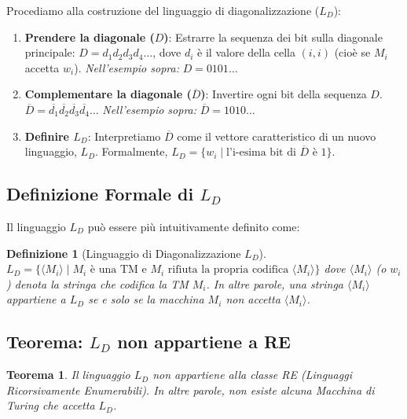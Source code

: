 \documentclass[a4paper]{article}
\newtheorem{theorem}{Teorema}
\newtheorem{definition}{Definizione}
\begin{document}
Procediamo alla costruzione del linguaggio di diagonalizzazione ($L_D$):
\begin{enumerate}
    \item \textbf{Prendere la diagonale ($D$)}: Estrarre la sequenza dei bit sulla diagonale principale: $D = d_1 d_2 d_3 d_4 \dots$, dove $d_i$ è il valore della cella $(i,i)$ (cioè se $M_i$ accetta $w_i$).
    \textit{Nell'esempio sopra:} $D = 0101\dots$
    \item \textbf{Complementare la diagonale ($\overline{D}$)}: Invertire ogni bit della sequenza $D$.
    $\overline{D} = \overline{d_1} \overline{d_2} \overline{d_3} \overline{d_4} \dots$
    \textit{Nell'esempio sopra:} $\overline{D} = 1010\dots$
    \item \textbf{Definire $L_D$}: Interpretiamo $\overline{D}$ come il vettore caratteristico di un nuovo linguaggio, $L_D$.
    Formalmente, $L_D = \{ w_i \mid \text{l'i-esima bit di } \overline{D} \text{ è } 1 \}$.
\end{enumerate}

\subsection{Definizione Formale di $L_D$}

Il linguaggio $L_D$ può essere più intuitivamente definito come:
\begin{definition}[Linguaggio di Diagonalizzazione $L_D$]
$L_D = \{ \langle M_i \rangle \mid M_i \text{ è una TM e } M_i \text{ rifiuta la propria codifica } \langle M_i \rangle \}$
dove $\langle M_i \rangle$ (o $w_i$) denota la stringa che codifica la TM $M_i$.
In altre parole, una stringa $\langle M_i \rangle$ appartiene a $L_D$ se e solo se la macchina $M_i$ non accetta $\langle M_i \rangle$.
\end{definition}

\subsection{Teorema: $L_D$ non appartiene a RE}

\begin{theorem}
Il linguaggio $L_D$ non appartiene alla classe RE (Linguaggi Ricorsivamente Enumerabili). In altre parole, non esiste alcuna Macchina di Turing che accetta $L_D$.
\end{theorem}
\end{document}
